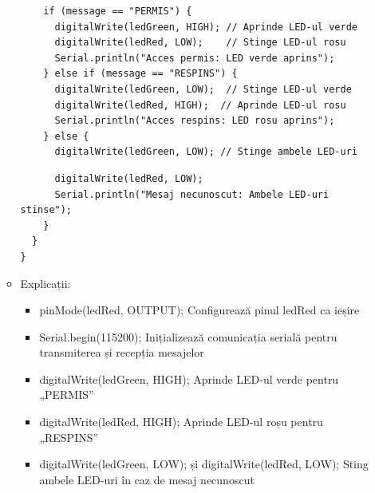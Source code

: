 \documentclass{report}
\begin{document}
\begin{itemize}
\begin{itemize}
\begin{lstlisting}
    if (message == "PERMIS") {
      digitalWrite(ledGreen, HIGH); // Aprinde LED-ul verde
      digitalWrite(ledRed, LOW);    // Stinge LED-ul rosu
      Serial.println("Acces permis: LED verde aprins");
    } else if (message == "RESPINS") {
      digitalWrite(ledGreen, LOW);  // Stinge LED-ul verde
      digitalWrite(ledRed, HIGH);  // Aprinde LED-ul rosu
      Serial.println("Acces respins: LED rosu aprins");
    } else {
      digitalWrite(ledGreen, LOW); // Stinge ambele LED-uri
      \end{lstlisting}
      \begin{lstlisting}
      digitalWrite(ledRed, LOW);
      Serial.println("Mesaj necunoscut: Ambele LED-uri stinse");
    }
  }
}

            \end{lstlisting}
            \item Explicații: 
                \begin{itemize}
                    \item pinMode(ledRed, OUTPUT);   Configurează pinul ledRed ca ieșire
                    \item Serial.begin(115200);   Inițializează comunicația serială pentru transmiterea și recepția mesajelor
                    \item digitalWrite(ledGreen, HIGH);   Aprinde LED-ul verde pentru „PERMIS”
                    \item digitalWrite(ledRed, HIGH);   Aprinde LED-ul roșu pentru „RESPINS”
                    \item digitalWrite(ledGreen, LOW); și digitalWrite(ledRed, LOW);   Sting ambele LED-uri în caz de mesaj necunoscut
                \end{itemize}
    \end{itemize}
\end{itemize}
\end{document}
